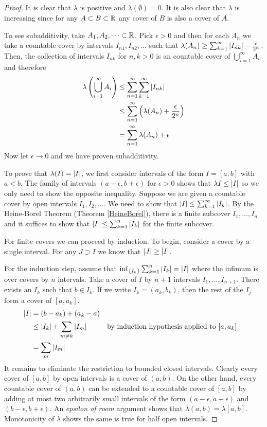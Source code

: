 \documentclass{amsart}
\theoremstyle{remark}
\theoremstyle{definition}
\begin{document}
\begin{proof}It is clear that $\lambda$ is positive and $\lambda(\emptyset) = 0$.  It is also
  clear that $\lambda$ is increasing since for any $A \subset B
  \subset \mathbb{R}$ any cover of $B$ is also a cover of $A$.  

To see subadditivity, take $A_1, A_2, \dots \subset \mathbb{R}$.  Pick
$\epsilon > 0$ and then for each $A_n$ we take a countable cover by intervals
$I_{n1}, I_{n2}, \dots$ such that $\lambda(A_n) \geq \sum_{k=1}^\infty
\left \vert I_{nk} \right \vert - \frac{\epsilon}{2^n}$.  Then, the collection of
intervals $I_{nk}$ for $n,k > 0$ is an countable cover of
$\bigcup_{i=1}^\infty A_i$ and therefore
\begin{align*}
\lambda \left (\bigcup_{i=1}^\infty A_i \right ) &\leq
\sum_{n=1}^\infty \sum_{k=1}^\infty \left \vert I_{nk} \right \vert \\
&\leq \sum_{n=1}^\infty \left ( \lambda(A_n) + \frac{\epsilon}{2^n}
\right )\\
&= \sum_{n=1}^\infty \lambda(A_n) + \epsilon
\end{align*}
Now let $\epsilon \to 0$ and we have proven subadditivity.

To prove that $\lambda(I) = \left \vert I \right \vert$, we first consider intervals of
the form $I = [a,b]$ with $a < b$.  The family of intervals $(a -
\epsilon, b+\epsilon)$ for $\epsilon > 0$ shows that $\lambda{I} \leq
\left \vert I \right \vert$ so we only need to show the opposite inequality.
Suppose we are given a countable cover by open intervals $I_1, I_2,
\dots$.  We need to show that $\left \vert I \right \vert \leq \sum_{k=1}^\infty \left \vert I_k \right \vert$.
By the Heine-Borel Theorem (Theorem \ref{HeineBorel}), there
is a finite subcover $I_1, \dots, I_n$ and it suffices to show
that $\left \vert I \right \vert \leq \sum_{k=1}^n \left \vert I_k \right \vert$ for the finite subcover.

For finite covers we
can proceed by induction.  To begin, consider a cover by a single
interval.  For any $J \supset I$ we know that
$\left \vert J \right \vert \geq \left \vert I \right \vert$.

For the induction step, assume that $\inf_{\{I_k\}} \sum_{k=1}^n
\left \vert I_k \right \vert = \left \vert I \right \vert$ where the infimum is over covers by $n$
intervals.  Take a cover of $I$ by $n+1$ intervals $I_1, \dots,
I_{n+1}$.  There exists an $I_k$ such that $b \in I_k$.  If we write
$I_k = (a_k,b_k)$, then the rest of the $I_j$ form a cover of
$[a,a_k]$.
\begin{align*}
\left \vert I \right \vert &= (b-a_k) + (a_k - a) \\
&\leq \left \vert I_k \right \vert + \sum_{m \neq k} \left \vert I_m \right \vert & &\text{by induction
  hypothesis applied to $[a,a_k]$} \\
&=\sum_m \left \vert I_m \right \vert
\end{align*}
It remains to eliminate the restriction to bounded closed intervals.
Clearly every cover of 
$[a,b]$ by open intervals is a cover of $(a,b)$.  On the other hand, every countable cover of $(a,b)$ can be extended to a countable cover of $[a,b]$ by adding
at most two arbitrarily small intervals of the form
$(a-\epsilon,a+\epsilon)$ and $(b-\epsilon,b+\epsilon)$.  An
\emph{epsilon of room} argument shows that $\lambda (a,b) = \lambda
[a,b]$.  Monotonicity of $\lambda$ shows the same is true for half
open intervals.



\end{proof}
\end{document}
